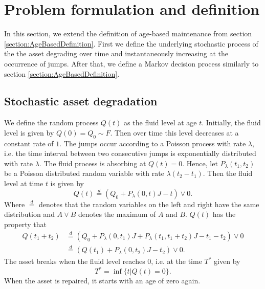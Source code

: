 \documentclass[a4paper]{thesis}
\theoremstyle{definition}
\begin{document}
\section{Problem formulation and definition}
In this section, we extend the definition of age-based maintenance from section \ref{section:AgeBasedDefinition}.
First we define the underlying stochastic process of the the asset degrading over time and instantaneously increasing at the occurrence of jumps.
After that, we define a Markov decision process similarly to section \ref{section:AgeBasedDefinition}.

\subsection{Stochastic asset degradation}
We define the random process $Q(t)$ as the fluid level at age $t$.
Initially, the fluid level is given by $Q(0)=Q_0\sim F$.
Then over time this level decreases at a constant rate of $1$.
The jumps occur according to a Poisson process with rate $\lambda$, i.e. the time interval between two consecutive jumps is exponentially distributed with rate $\lambda$.
The fluid process is absorbing at $Q(t)=0$.
Hence, let $P_\lambda(t_1,t_2)$ be a Poisson distributed random variable with rate $\lambda (t_2-t_1)$.
Then the fluid level at time $t$ is given by 
\[
Q(t)\stackrel d=(Q_0+P_\lambda(0,t)J-t)\vee 0.
\]
Where $\stackrel d=$ denotes that the random variables on the left and right have the same distribution and $A\vee B$ denotes the maximum of $A$ and $B$.
$Q(t)$ has the property that
\[
\begin{split}
Q(t_1+t_2)&\stackrel d=( Q_0+P_\lambda(0,t_1)J+P_\lambda(t_1,t_1+t_2)J-t_1-t_2)\vee0\\
&\stackrel d= (Q(t_1)+P_\lambda(0,t_2)J-t_2)\vee0.
\end{split}
\]
The asset breaks when the fluid level reaches $0$, i.e. at the time $T^*$ given by
\[
T^*=\inf\{t|Q(t)=0\}.
\]
When the asset is repaired, it starts with an age of zero again.
\end{document}
